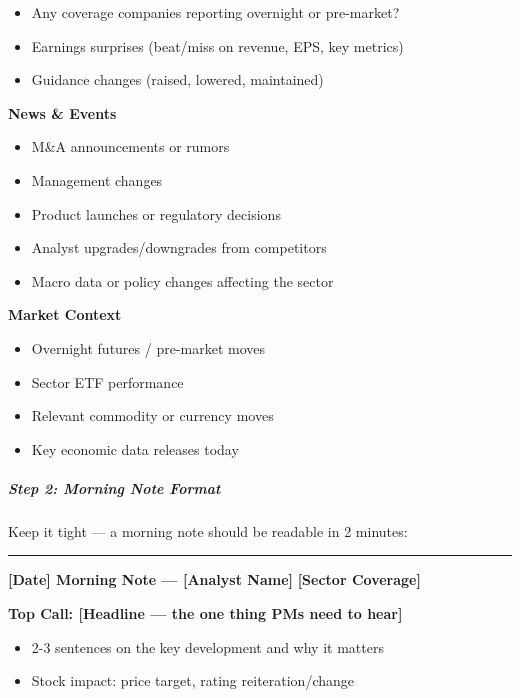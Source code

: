 \documentclass[11pt]{article}
\begin{document}
\begin{itemize}[leftmargin=*,itemsep=2pt,topsep=2pt]
\item {} Any coverage companies reporting overnight or pre-market?
\item {} Earnings surprises (beat/miss on revenue, EPS, key metrics)
\item {} Guidance changes (raised, lowered, maintained)
\end{itemize}

\textbf{News \& Events}

\begin{itemize}[leftmargin=*,itemsep=2pt,topsep=2pt]
\item {} M\&A announcements or rumors
\item {} Management changes
\item {} Product launches or regulatory decisions
\item {} Analyst upgrades/downgrades from competitors
\item {} Macro data or policy changes affecting the sector
\end{itemize}

\textbf{Market Context}

\begin{itemize}[leftmargin=*,itemsep=2pt,topsep=2pt]
\item {} Overnight futures / pre-market moves
\item {} Sector ETF performance
\item {} Relevant commodity or currency moves
\item {} Key economic data releases today
\end{itemize}

\subparagraph{Step 2: Morning Note Format}\mbox{}\par

Keep it tight — a morning note should be readable in 2 minutes:


\vspace{0.5em}\hrule\vspace{0.5em}

\textbf{[Date] Morning Note — [Analyst Name]} \textbf{[Sector Coverage]}


\textbf{Top Call: [Headline — the one thing PMs need to hear]}

\begin{itemize}[leftmargin=*,itemsep=2pt,topsep=2pt]
\item {} 2-3 sentences on the key development and why it matters
\item {} Stock impact: price target, rating reiteration/change
\end{itemize}
\end{document}

